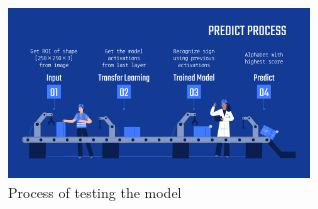 \documentclass[twocolumn]{article}
\begin{document}
\begin{figure}[h]
\centering
\includegraphics[width=8cm]{./figures/predict process}
\caption{Process of testing the model}
\end{figure}

\clearpage

\clearpage
\end{document}
